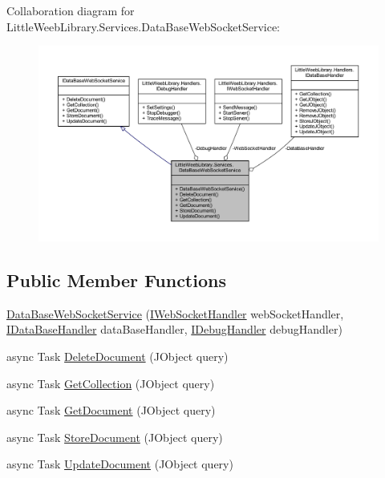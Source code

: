 Collaboration diagram for Little\+Weeb\+Library.\+Services.\+Data\+Base\+Web\+Socket\+Service\+:\nopagebreak
\begin{figure}[H]
\begin{center}
\leavevmode
\includegraphics[width=350pt]{class_little_weeb_library_1_1_services_1_1_data_base_web_socket_service__coll__graph}
\end{center}
\end{figure}
\subsection*{Public Member Functions}
\begin{DoxyCompactItemize}
\item 
\mbox{\hyperlink{class_little_weeb_library_1_1_services_1_1_data_base_web_socket_service_a052238e0026967e104db0c6723923c7b}{Data\+Base\+Web\+Socket\+Service}} (\mbox{\hyperlink{interface_little_weeb_library_1_1_handlers_1_1_i_web_socket_handler}{I\+Web\+Socket\+Handler}} web\+Socket\+Handler, \mbox{\hyperlink{interface_little_weeb_library_1_1_handlers_1_1_i_data_base_handler}{I\+Data\+Base\+Handler}} data\+Base\+Handler, \mbox{\hyperlink{interface_little_weeb_library_1_1_handlers_1_1_i_debug_handler}{I\+Debug\+Handler}} debug\+Handler)
\item 
async Task \mbox{\hyperlink{class_little_weeb_library_1_1_services_1_1_data_base_web_socket_service_a5d9baf510f46f6a3fac9fe84325bb017}{Delete\+Document}} (J\+Object query)
\item 
async Task \mbox{\hyperlink{class_little_weeb_library_1_1_services_1_1_data_base_web_socket_service_aef8bdd650778c72d639f1e89c1d6dcad}{Get\+Collection}} (J\+Object query)
\item 
async Task \mbox{\hyperlink{class_little_weeb_library_1_1_services_1_1_data_base_web_socket_service_aa51350396b2aa1634a680c94bebdc64c}{Get\+Document}} (J\+Object query)
\item 
async Task \mbox{\hyperlink{class_little_weeb_library_1_1_services_1_1_data_base_web_socket_service_af85671a494e85f8418f60606566521f0}{Store\+Document}} (J\+Object query)
\item 
async Task \mbox{\hyperlink{class_little_weeb_library_1_1_services_1_1_data_base_web_socket_service_a3771a51f4d0aab2cd4f65676427d0902}{Update\+Document}} (J\+Object query)
\end{DoxyCompactItemize}
